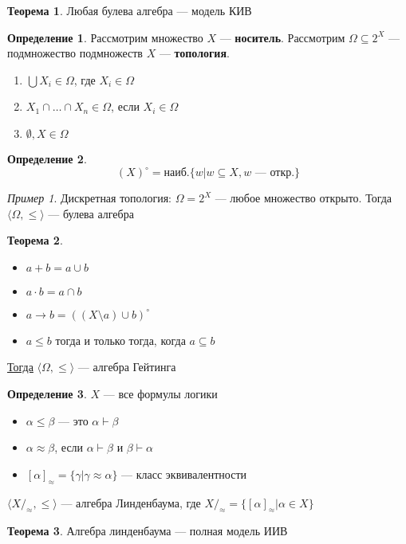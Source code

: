 \documentclass[oneside]{book}
\newcounter{propertycnt}
\newcommand{\beginproperty}{\setcounter{propertycnt}{1}}
\theoremstyle{plain}
\newenvironment{property}{
  \renewcommand\thepropertyinner{\arabic{propertycnt}}
  \propertyinner
}{\endpropertyinner\stepcounter{propertycnt}}
\theoremstyle{remark}
\newtheorem*{examp}{Пример}
\theoremstyle{definition}
\newtheorem{theorem}{Теорема}[section]
\newtheorem*{definition}{Определение}
\begin{document}
\begin{theorem}
Любая булева алгебра --- модель КИВ
\end{theorem}
\begin{definition}
Рассмотрим множество \(X\) --- \textbf{носитель}. Рассмотрим \(\Omega \subseteq 2^X\) --- подмножество подмножеств \(X\) --- \textbf{топология}.
\begin{enumerate}
\item \(\bigcup X_i \in \Omega\), где \(X_i \in \Omega\)
\item \(X_1 \cap \dots \cap X_n \in \Omega\), если \(X_i \in \Omega\)
\item \(\emptyset, X \in \Omega\)
\end{enumerate}
\label{org37468dc}
\end{definition}
\begin{definition}
\[ (X)^\circ = \text{наиб.}\{w \big| w \subseteq X, w\text{ --- откр.}\}\]
\label{org1be2563}
\end{definition}
\begin{examp}
Дискретная топология: \(\Omega = 2^X\) --- любое множество открыто. Тогда \(\langle \Omega, \le \rangle\) --- булева алгебра
\label{org15f9d7c}
\end{examp}
\begin{theorem}
\-
\begin{itemize}
\item \(a + b = a \cup b\)
\item \(a \cdot b = a \cap b\)
\item \(a \to b = \left((X \setminus a) \cup b\right)^\circ\)
\item \(a \le b\) тогда и только тогда, когда \(a \subseteq b\)
\end{itemize}
\uline{Тогда} \(\langle \Omega, \le \rangle\) --- алгебра Гейтинга
\label{orgf07fe70}
\end{theorem}
\begin{definition}
\(X\) --- все формулы логики
\begin{itemize}
\item \(\alpha \le \beta\) --- это \(\alpha \vdash \beta\)
\item \(\alpha \approx \beta\), если \(\alpha \vdash \beta\) и \(\beta \vdash \alpha\)
\item \([\alpha]_\approx = \{\gamma \big| \gamma \approx \alpha\}\) --- класс эквивалентности
\end{itemize}
\label{orgd4c2693}
\end{definition}
\beginproperty
\begin{property}
\(\langle X/_\approx, \le \rangle\) --- алгебра Линденбаума, где \(X/_\approx = \{[\alpha]_\approx \big| \alpha \in X\}\)
\label{org34c29ba}
\end{property}
\begin{theorem}
Алгебра линденбаума --- полная модель ИИВ
\end{theorem}
\end{document}
